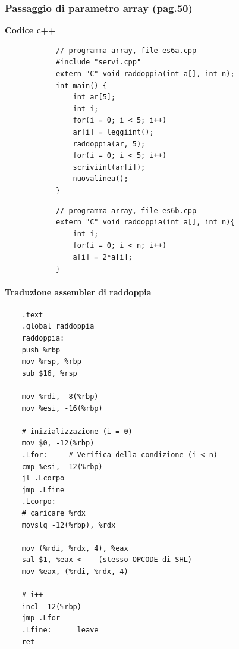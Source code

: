 \subsubsection{Passaggio di parametro array (pag.50)}
\begin{framed}
	\noindent \textbf{Codice c++} 
	\begin{multicols}{2}
		\begin{verbatim}
			// programma array, file es6a.cpp
			#include "servi.cpp"
			extern "C" void raddoppia(int a[], int n);
			int main() {
				int ar[5];
				int i;
				for(i = 0; i < 5; i++)
				ar[i] = leggiint();
				raddoppia(ar, 5);
				for(i = 0; i < 5; i++)
				scriviint(ar[i]);
				nuovalinea();
			}
		\end{verbatim}
		\columnbreak
		\begin{verbatim}
			// programma array, file es6b.cpp
			extern "C" void raddoppia(int a[], int n){
				int i;
				for(i = 0; i < n; i++)
				a[i] = 2*a[i]; 
			}
		\end{verbatim}
	\end{multicols}
\end{framed}
\clearpage 
\paragraph{Traduzione assembler di raddoppia}
\begin{verbatim}
	.text
	.global raddoppia
	raddoppia: 
	push %rbp
	mov %rsp, %rbp
	sub $16, %rsp
	
	mov %rdi, -8(%rbp)
	mov %esi, -16(%rbp)
	
	# inizializzazione (i = 0)
	mov $0, -12(%rbp)
	.Lfor:     # Verifica della condizione (i < n)
	cmp %esi, -12(%rbp)
	jl .Lcorpo
	jmp .Lfine
	.Lcorpo:     
	# caricare %rdx
	movslq -12(%rbp), %rdx
	
	mov (%rdi, %rdx, 4), %eax
	sal $1, %eax <--- (stesso OPCODE di SHL)
	mov %eax, (%rdi, %rdx, 4)
	
	# i++
	incl -12(%rbp)
	jmp .Lfor
	.Lfine:      leave
	ret
\end{verbatim}

